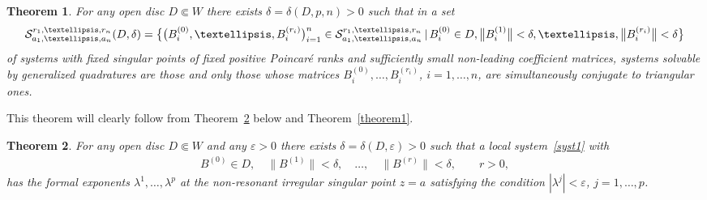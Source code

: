 \documentclass[11pt]{article}
\numberwithin{equation}{section}
\newtheorem{Theorem}{Theorem}[section]
\begin{document}
\begin{Theorem}\label{theorem4}
For any open disc $D\Subset W$ there exists $\delta=\delta(D,p,n)>0$ such that in a set
\begin{gather*}
{\cal S}_{a_1,\ldots,a_n}^{r_1,\ldots,r_n}(D,\delta)=\bigl\{ \big(B^{(0)}_i,\ldots,B^{(r_i)}_i\big)_{i=1}^n \in
{\cal S}_{a_1,\ldots,a_n}^{r_1,\ldots,r_n} \,|\, B^{(0)}_i \in D, \big\|B^{(1)}_i\big\|<\delta,\ldots,\big\|B^{(r_i)}_i\big\|<\delta\bigr\}
\end{gather*}
of systems with fixed singular points of fixed positive Poincar\'e ranks and sufficiently small non-leading coefficient matrices, systems solvable by generalized quadratures are those and only those whose matrices $B^{(0)}_i,\ldots,B^{(r_i)}_i$, $i=1,\ldots,n$, are simultaneously conjugate to triangular ones.
\end{Theorem}

This theorem will clearly follow from Theorem~\ref{theorem5} below and Theorem~\ref{theorem1}.

\begin{Theorem}\label{theorem5}
For any open disc $D\Subset W$ and any $\varepsilon>0$ there exists $\delta=\delta(D,\varepsilon)>0$ such that a local system~\eqref{syst1} with
\begin{gather*}
B^{(0)}\in D, \quad \big\|B^{(1)}\big\|<\delta, \quad \ldots, \quad \big\|B^{(r)}\big\|<\delta, \qquad r>0,
\end{gather*}
has the formal exponents $\lambda^1,\ldots,\lambda^p$ at the non-resonant irregular singular point $z=a$ satisfying the condition $|\lambda^j|<\varepsilon$, $j=1,\ldots,p$.
\end{Theorem}
\end{document}

